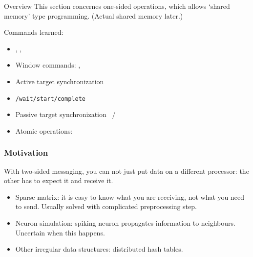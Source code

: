 
\begin{frame}[containsverbatim]{Overview}
  This section concernes one-sided operations, which allows `shared
  memory' type programming. (Actual shared memory later.)

  Commands learned:
  \begin{itemize}
  \item {}, , 
  \item Window commands: , 
  \item Active target synchronization 
  \item {}\lstinline{/wait/start/complete}
  \item Passive target synchronization ~/
  \item Atomic operations: 
  \end{itemize}
\end{frame}


\begin{frame}[containsverbatim]\frametitle{Motivation}
  With two-sided messaging, you can not just put data
  on a different processor: the other has to expect it and receive it.

  \begin{itemize}
  \item Sparse matrix: it is easy to know what you are receiving, not
    what you need to send.  Usually solved with complicated
    preprocessing step.
  \item Neuron simulation: spiking neuron propagates information to neighbours.
    Uncertain when this happens.
  \item Other irregular data structures: distributed hash tables.
  \end{itemize}
\end{frame}

